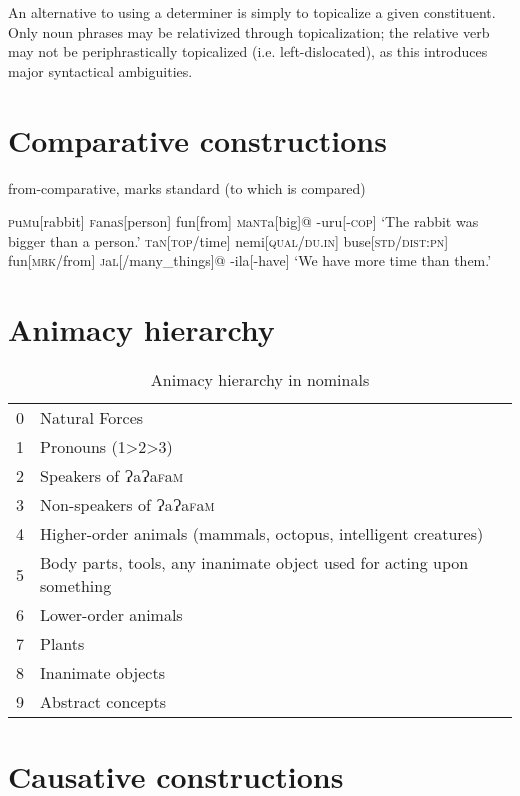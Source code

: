 \documentclass[a4paper,10pt,twoside,openright]{memoir}
\newcommand{\lang}{ɁaɁa\textsc{f}a\textsc{m}}
\newcommand{\famword}[5]{#1\textsc{#2}#3\textsc{#4}#5}
\begin{document}
An alternative to using a determiner is simply to topicalize a given constituent. Only noun phrases may be relativized through topicalization; the relative verb may not be periphrastically topicalized (i.e. left-dislocated), as this introduces major syntactical ambiguities.

\section{Comparative constructions}

from-comparative, marks standard (to which is compared)

\pex[interpartskip=3ex]
\a
\begingl
\famword{}{p}{u}{m}{u}[rabbit]
\famword{}{f}{ana}{s}{}[person]
fun[from]
\famword{}{m}{a}{nt}{a}[big]@
-uru[\textsc{-cop}]
\glft `The rabbit was bigger than a person.'
\endgl
\a
\begingl
\famword{}{t}{a}{n}{}[\textsc{top}/time]
nemi[\textsc{qual}/\textsc{du.in}]
buse[\textsc{std}/\textsc{dist:pn}]
fun[\textsc{mrk}/from]
\famword{}{j}{a}{l}{}[/many\_things]@
-ila[-have]
\glft `We have more time than them.'
\endgl
\xe

\section{Animacy hierarchy}

\begin{table}[ht]
    \centering
    \begin{tabular}{ll}
    0 & Natural Forces \\
    1 & Pronouns (1>2>3) \\
    2 & Speakers of \lang{} \\
    3 & Non-speakers of \lang{} \\
    4 & Higher-order animals (mammals, octopus, intelligent creatures) \\
    5 & \parbox[t]{7cm}{Body parts, tools, any inanimate object used for acting upon something} \\
    6 & Lower-order animals \\
    7 & Plants \\
    8 & Inanimate objects \\
    9 & Abstract concepts 
    \end{tabular}
    \caption{Animacy hierarchy in nominals}
    \label{tab:hierarchy}
\end{table}

\section{Causative constructions}
\end{document}
